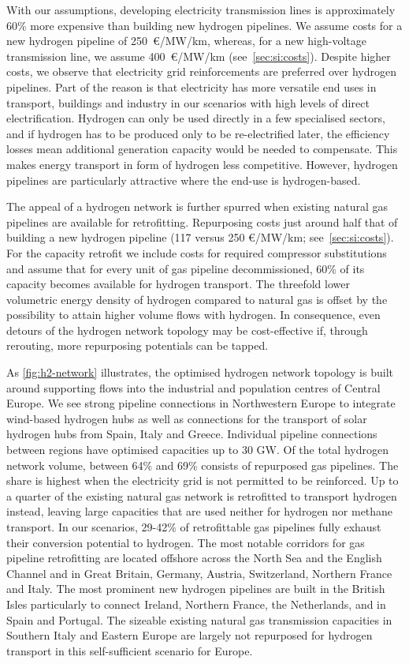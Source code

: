 With our assumptions, developing electricity transmission lines is approximately
60\% more expensive than building new hydrogen pipelines. We assume costs for a
new hydrogen pipeline of 250~\euro/MW/km, whereas, for a new high-voltage
transmission line, we assume 400~\euro/MW/km (see~\cref{sec:si:costs}). Despite
higher costs, we observe that electricity grid reinforcements are preferred over
hydrogen pipelines. Part of the reason is that electricity has more versatile
end uses in transport, buildings and industry in our scenarios with high levels
of direct electrification. Hydrogen can only be used directly in a few
specialised sectors, and if hydrogen has to be produced only to be
re-electrified later, the efficiency losses mean additional generation capacity
would be needed to compensate. This makes energy transport in form of hydrogen
less competitive. However, hydrogen pipelines are particularly attractive where
the end-use is hydrogen-based.

The appeal of a hydrogen network is further spurred when existing natural gas
pipelines are available for retrofitting. Repurposing costs just around half
that of building a new hydrogen pipeline (117 versus 250 \euro/MW/km;
see~\cref{sec:si:costs}). For the capacity retrofit we include costs for
required compressor substitutions and assume that for every unit of gas pipeline
decommissioned, 60\% of its capacity becomes available for hydrogen transport.
The threefold lower volumetric energy density of hydrogen compared to natural
gas is offset by the possibility to attain higher volume flows with hydrogen. In
consequence, even detours of the hydrogen network topology may be cost-effective
if, through rerouting, more repurposing potentials can be tapped.

As \cref{fig:h2-network} illustrates, the optimised hydrogen network topology is
built around supporting flows into the industrial and population centres of
Central Europe. We see strong pipeline connections in Northwestern Europe to
integrate wind-based hydrogen hubs as well as connections for the transport of
solar hydrogen hubs from Spain, Italy and Greece. Individual pipeline
connections between regions have optimised capacities up to 30 GW. Of the total
hydrogen network volume, between 64\% and 69\% consists of repurposed gas
pipelines. The share is highest when the electricity grid is not permitted to be
reinforced. Up to a quarter of the existing natural gas network is retrofitted
to transport hydrogen instead, leaving large capacities that are used neither
for hydrogen nor methane transport. In our scenarios, 29-42\% of retrofittable
gas pipelines fully exhaust their conversion potential to hydrogen. The most
notable corridors for gas pipeline retrofitting are located offshore across the
North Sea and the English Channel and in Great Britain, Germany, Austria,
Switzerland, Northern France and Italy. The most prominent new hydrogen
pipelines are built in the British Isles particularly to connect Ireland,
Northern France, the Netherlands, and in Spain and Portugal. The sizeable
existing natural gas transmission capacities in Southern Italy and Eastern
Europe are largely not repurposed for hydrogen transport in this self-sufficient
scenario for Europe.

